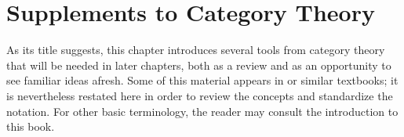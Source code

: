 
\chapter{Supplements to Category Theory}\label{sec:categories}
\hypertarget{o014.aljabr2.chapter1.overview}{ }

As its title suggests, this chapter introduces several tools from category
theory that will be needed in later chapters, both as a review and as an
opportunity to see familiar ideas afresh. Some of this material appears in
\cite{Li1} or similar textbooks; it is nevertheless restated here in order to
review the concepts and standardize the notation. For other basic terminology,
the reader may consult the introduction to this book.

